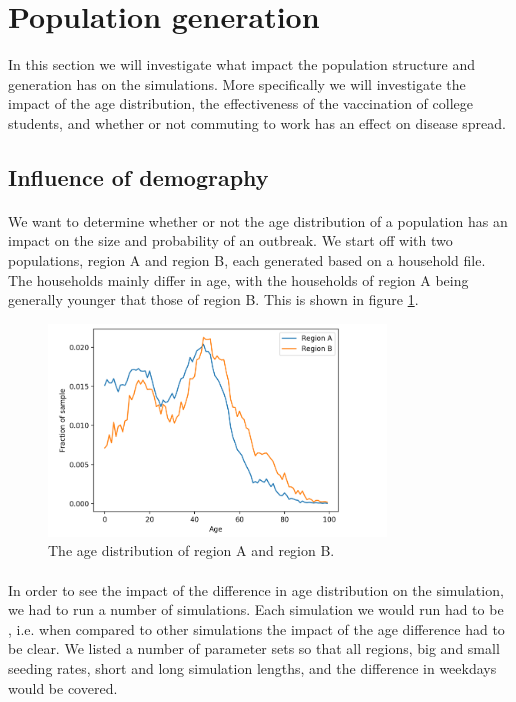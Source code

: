 \documentclass[runningheads]{llncs}
\begin{document}
\section{Population generation}

In this section we will investigate what impact the population structure and generation has on the simulations. More specifically we will investigate the impact of the age distribution, the effectiveness of the vaccination of college students, and whether or not commuting to work has an effect on disease spread.

\subsection{Influence of demography}

\paragraph{} We want to determine whether or not the age distribution of a population has an impact on the size and probability of an outbreak. We start off with two populations, region A and region B, each generated based on a household file. The households mainly differ in age, with the households of region A being generally younger that those of region B. This is shown in figure \ref{2_1_regionDiff_plotAgeDistr}.

\begin{figure}[H]
\centering
\includegraphics[width=0.8\textwidth]{./2_1_regionDiff/plot_ageDistr.png}
\caption{The age distribution of region A and region B.}
\label{2_1_regionDiff_plotAgeDistr}
\end{figure}

\paragraph{} In order to see the impact of the difference in age distribution on the simulation, we had to run a number of simulations. Each simulation we would run had to be , i.e. when compared to other simulations the impact of the age difference had to be clear. We listed a number of parameter sets so that all regions, big and small seeding rates, short and long simulation lengths, and the difference in weekdays would be covered.
\end{document}
